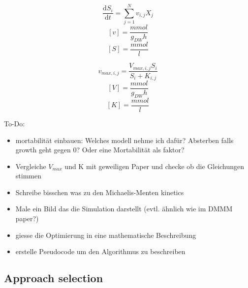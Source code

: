 \documentclass[a4paper,10pt]{article}
\begin{document}
\begin{equation}
 \frac{\mathrm d S_i}{\mathrm d t} = \displaystyle\sum_{j=1}^{N} v_{i,j} X_j
\end{equation}
\begin{equation}
 \left[ v \right] = \frac{mmol}{g_{DW} h}
\end{equation}
\begin{equation}
 \left[ S \right] = \frac{mmol}{l}
\end{equation}

\begin{equation}
 v_{max,i,j} = \frac{V_{max,i,j} S_i}{S_i + K_{i,j}}
\end{equation}
\begin{equation}
 \left[ V \right] = \frac{mmol}{g_{DW} h}
\end{equation}
\begin{equation}
 \left[ K \right] = \frac{mmol}{l}
\end{equation}

To-Do:
\begin{itemize}
 \item mortabilität einbauen: Welches modell nehme ich dafür? Absterben falls growth geht gegen 0? Oder eine Mortabilität als faktor?
 \item Vergleiche $V_{max}$ und K mit geweiligen Paper und checke ob die Gleichungen stimmen
 \item Schreibe bisschen was zu den Michaelis-Menten kinetics
 \item Male ein Bild das die Simulation darstellt (evtl. ähnlich wie im DMMM paper?)
 \item giesse die Optimierung in eine mathematische Beschreibung
 \item erstelle Pseudocode um den Algorithmus zu beschreiben
\end{itemize}






\subsection{Approach selection}
\end{document}
